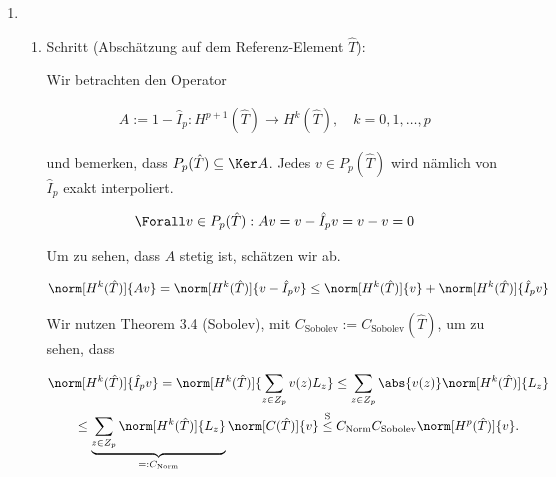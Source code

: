 \begin{solution}
\begin{enumerate}[label = \textbf{\alph*)}]
    \item \phantom{}


    \begin{enumerate}[label = \arabic*.]

      \item Schritt (Abschätzung auf dem Referenz-Element $\hat T$):

      Wir betrachten den Operator

      \begin{align*}
        A := 1 - \hat I_p:
        H^{p+1}(\hat T) \to H^k(\hat T),
        \quad
        k = 0, 1, \dots, p
      \end{align*}

      und bemerken, dass $P_p(\hat T) \subseteq \Ker A$.
      Jedes $v \in P_p(\hat T)$ wird nämlich von $\hat I_p$ exakt interpoliert.

      \begin{align*}
        \Forall v \in P_p(\hat T):
        A v = v - \hat I_p v = v - v = 0
      \end{align*}

      Um zu sehen, dass $A$ stetig ist, schätzen wir ab.

      \begin{align*}
        \norm[H^k(\hat T)]{A v}
        =
        \norm[H^k(\hat T)]{v - \hat I_p v}
        \leq
        \norm[H^k(\hat T)]{v}
        +
        \norm[H^k(\hat T)]{\hat I_p v}
      \end{align*}

      Wir nutzen Theorem 3.4 (Sobolev), mit $C_\mathrm{Sobolev} := C_\mathrm{Sobolev}(\hat T)$, um zu sehen, dass

      \begin{multline*}
        \norm[H^k(\hat T)]{\hat I_p v}
        =
        \norm[H^k(\hat T)]
        {
          \sum_{z \in Z_p}
          v(z) L_z
        }
        \leq
        \sum_{z \in Z_p}
        \abs{v(z)} \norm[H^k(\hat T)]{L_z} \\
        \leq
        \underbrace
        {
          \sum_{z \in Z_p}
          \norm[H^k(\hat T)]{L_z}
        }_{
          =: C_\mathrm{Norm}
        }
        \norm[C(\hat T)]{v}
        \stackrel
        {
          \mathrm{S}
        }{\leq}
        C_\mathrm{Norm}
        C_\mathrm{Sobolev}
        \norm[H^p(\hat T)]{v}.
      \end{multline*}


\end{enumerate}
\end{enumerate}
\end{solution}
